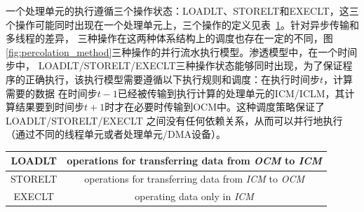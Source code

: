 \begin{flushleft}
一个处理单元的执行遵循三个操作状态：LOADLT、STORELT和EXECLT，这三个操作可能同时出现在一个处理单元上，三个操作的定义见表~\ref{tab:notation}。针对异步传输和多线程的差异，
三种操作在这两种体系结构上的调度也存在一定的不同，图\ref{fig:percolation_method}三种操作的并行流水执行模型。渗透模型中，在一个时间步中，
LOADLT/STORELT/EXECLT三种操作状态能够同时出现，为了保证程序的正确执行，该执行模型需要遵循以下执行规则和调度：在执行时间步$t$，计算需要的数据
在时间步$t-1$已经被传输到执行计算的处理单元的ICM/ICLM，其计算结果要到时间步$t+1$时才在必要时传输到OCM中。这种调度策略保证了LOADLT/STORELT/EXECLT
之间没有任何依赖关系，从而可以并行地执行（通过不同的线程单元或者处理单元/DMA设备）。
\begin{table}[!htbp]
	\begin{center}
		\begin{tabular}{|c|c|}
			\hline LOADLT & operations for transferring data from {\em OCM} to {\em ICM}\\\hline
			STORELT & operations for transferring data from {\em ICM} to {\em OCM}\\\hline
			EXECLT & operating data only in {\em ICM}\\\hline
		\end{tabular}
	\end{center}
	\label{tab:notation}
\end{table}


\end{flushleft}
